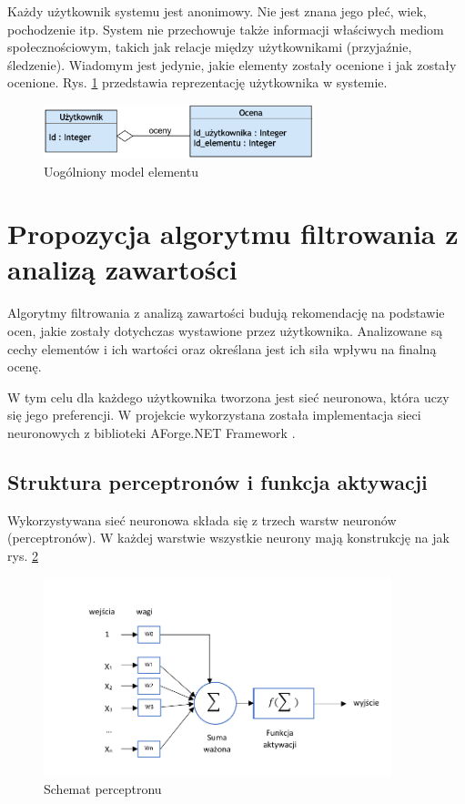 \documentclass[twoside]{iisthesis}
\begin{document}
	Każdy użytkownik systemu jest anonimowy. Nie jest znana jego płeć, wiek, pochodzenie itp. System nie przechowuje także informacji właściwych mediom społecznościowym, takich jak relacje między użytkownikami (przyjaźnie, śledzenie). Wiadomym jest jedynie, jakie elementy zostały ocenione i jak zostały ocenione. Rys. \ref{fig:modelUsera} przedstawia reprezentację użytkownika w systemie.
	
	\begin{figure}[!ht] 
		\centering
		\includegraphics[width=0.7\textwidth]{modelUsera}
		\caption{Uogólniony model elementu}
		\label{fig:modelUsera}
	\end{figure}
		 
 	\section{Propozycja algorytmu filtrowania z analizą zawartości}
	\label{s:propozycjaalgorytmucbf}
	 
	Algorytmy filtrowania z analizą zawartości budują rekomendację na podstawie ocen, jakie zostały dotychczas wystawione przez użytkownika. Analizowane są cechy elementów i ich wartości oraz określana jest ich siła wpływu na finalną ocenę. 
	
	W tym celu dla każdego użytkownika tworzona jest sieć neuronowa, która uczy się jego preferencji. W projekcie wykorzystana została implementacja sieci neuronowych z biblioteki AForge.NET Framework \cite{aforgenet}.
	 
	 \subsection{Struktura perceptronów i funkcja aktywacji}
	 \label{sss:strukturaperceptronow}
	 
	 Wykorzystywana sieć neuronowa składa się z trzech warstw neuronów (perceptronów). W każdej warstwie wszystkie neurony mają konstrukcję na jak rys. \ref{fig:schematneuronu}
	 
	 \begin{figure}[!ht] 		 		 	
	 	\includegraphics[width=0.9\textwidth]{schematneuron}
	 	\caption{Schemat perceptronu}
	 	\label{fig:schematneuronu}
	 \end{figure}
	 
\end{document}
